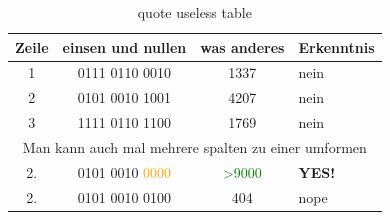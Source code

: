 \documentclass[a4paper,12pt]{article}
\begin{document}
	\begin{table}[h!]
		\caption{quote useless table}
		\begin{tabular}{c|c|c|l}\hline
			Zeile & einsen und nullen & was anderes & Erkenntnis \\ \hline
			1 & 0111 0110 0010 & 1337 & nein \\
			2 & 0101 0010 1001 & 4207 & nein \\
			3 & 1111 0110 1100 & 1769 & nein\\ \hline
			\multicolumn{4}{c}{Man kann auch mal mehrere spalten zu einer umformen}  \\ \hline
			2. & 0101 0010 \textcolor{orange}{0000} & \textcolor{green}{>9000} & \textbf{YES!} \\
			2. & 0101 0010 0100 & 404 & nope
		\end{tabular}
	\end{table} 
	
	
	
\end{document}
